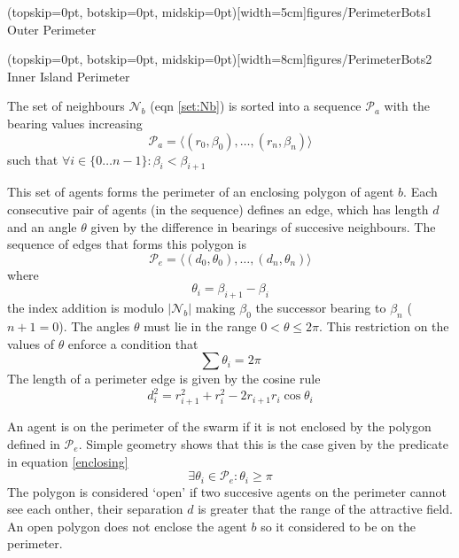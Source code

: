 \documentclass{ieeeaccess}
\begin{document}
\Figure[t!](topskip=0pt, botskip=0pt, midskip=0pt)[width=5cm]{figures/PerimeterBots1}
{Outer Perimeter\label{fig:PerimeterBots1}}

\Figure[t!](topskip=0pt, botskip=0pt, midskip=0pt)[width=8cm]{figures/PerimeterBots2}
{Inner Island Perimeter\label{fig:PerimeterBots2}}


The set of neighbours $\mathcal N_b$ (eqn \ref{set:Nb}) is sorted into a
sequence $\mathcal P_a$ with the bearing values
increasing
\begin{equation}
	\mathcal P_a = \langle (r_0,\beta_0),\ldots,(r_n,\beta_n) \rangle
\end{equation}
such that $\forall i \in \{0\ldots n-1\}: \beta_i<\beta_{i+1}$

This set of agents forms the perimeter of an enclosing polygon of agent $b$. 
Each consecutive pair of agents (in the sequence) defines an edge, which has
length $d$ and an angle $\theta$ given by the difference in bearings of
succesive neighbours.  The sequence of edges
that forms this polygon is
\begin{equation}
	\mathcal{P}_e = \langle (d_0,\theta_0), \ldots , (d_n,\theta_n) \rangle
\end{equation}
where
\begin{equation}
	\theta_i = \beta_{i+1} - \beta_i
\end{equation}
the index addition is modulo $|\mathcal N_b|$ making $\beta_0$ the successor
bearing to $\beta_n$ ($n+1 = 0$).  The angles $\theta$ must lie in the range
$0<\theta\leq2\pi$.
This restriction on the values of $\theta$ enforce a condition that
\begin{equation}
	\sum\theta_i = 2\pi
\end{equation}
The length of a perimeter edge is given by the cosine rule
\begin{equation}
	d_i^2 = r_{i+1}^2 + r_i^2 -2r_{i+1}r_i \cos\theta_i
\end{equation}

An agent is on the perimeter of the swarm if it is not enclosed by the polygon
defined in $\mathcal{P}_e$.  Simple geometry shows that this is the case given
by the predicate in equation \ref{enclosing}
\begin{equation}
	\exists \theta_i \in \mathcal{P}_e : \theta_i\geq\pi
	\label{enclosing}
\end{equation}
The polygon is considered `open' if two succesive agents on the perimeter 
cannot see each onther, their separation $d$ is greater that the range of the
attractive field.  An open polygon does not enclose the agent $b$ so it
considered to be on the perimeter.
\end{document}
